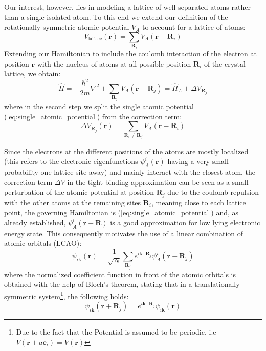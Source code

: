 \documentclass[11pt, a4paper, oneside]{book}
\theoremstyle{definition} %
\begin{document}
Our interest, however, lies in modeling a lattice of well separated atoms rather than a single isolated atom. To this end we extend our definition of the rotationally symmetric atomic potential $V_A$ to account for a lattice of atoms:
\begin{equation}
	V_\text{lattice}(\mathbf{r}) = \sum_{\mathbf{R}_i} V_A(\mathbf{r} - \mathbf{R}_i)
\end{equation}
 Extending our Hamiltonian to include the coulomb interaction of the electron at position $\mathbf{r}$ with the nucleus of atoms at all possible position $\mathbf{R}_i$ of the crystal lattice, we obtain:
\begin{equation}
	\hat{H} = - \frac{\hbar^2}{2m} \nabla^2 + \sum_{\mathbf{R}_j} V_A(\mathbf{r} - \mathbf{R}_j) = \hat{H}_A + \Delta V_{\mathbf{R}_j}
\end{equation}
where in the second step we split the single atomic potential (\ref{eq:single_atomic_potential}) from the correction term:
\begin{equation}
	\Delta V_{\mathbf{R}_j}(\mathbf{r}) = \sum_{\mathbf{R}_i \neq \mathbf{R}_j} V_A(\mathbf{r} - \mathbf{R}_i)
\end{equation}

Since the electrons at the different positions of the atoms are mostly localized (this refers to the electronic eigenfunctions $\psi_A^i(\mathbf{r})$ having a very small probability one lattice site away) and mainly interact with the closest atom, the correction term $\Delta V$ in the tight-binding approximation can be seen as a small perturbation of the atomic potential at position $\mathbf{R}_j$ due to the coulomb repulsion with the other atoms at the remaining sites $\mathbf{R}_i$, meaning close to each lattice point, the governing Hamiltonian is (\ref{eq:single_atomic_potential}) and, as already established, $\psi_A^i(\mathbf{r} - \mathbf{R})$ is a good approximation for low lying electronic energy state. This consequently motivates the use of a linear combination of atomic orbitals (LCAO):
\begin{equation}
	\psi_{i \mathbf{k}}(\mathbf{r}) = \frac{1}{\sqrt{N}} \sum_{\mathbf{R}_j} e^{i \mathbf{k} \cdot \mathbf{R}_j } \psi_{A}^i(\mathbf{r} - \mathbf{R}_j)
	\label{eq:LCAO_Ansatz}
\end{equation} 
where the normalized coefficient function in front of the atomic orbitals is obtained with the help of Bloch's theorem, stating that in a translationally symmetric system\footnote{Due to the fact that the Potential is assumed to be periodic, i.e $V(\mathbf{r} + a\mathbf{e}_i) = V(\mathbf{r})$}, the following holds:
\begin{equation}
	\psi_{i\mathbf{k}}(\mathbf{r} + \mathbf{R}_j) = e^{i \mathbf{k} \cdot \mathbf{R}_j} \psi_{i\mathbf{k}}(\mathbf{r})
\end{equation}
\end{document}

